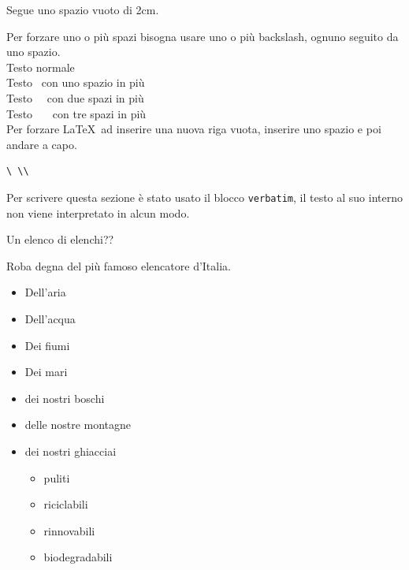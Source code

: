 \documentclass[envcountsame,envcountchap]{svmono}
\begin{document}
Segue uno spazio vuoto di 2cm.

\vspace*{2cm}

Per forzare uno o più spazi bisogna usare uno o più backslash, ognuno seguito da uno spazio.\\
Testo normale\\
Testo \ con uno spazio in più\\
Testo \ \ con due spazi in più\\
Testo \ \ \ con tre spazi in più\\

Per forzare \LaTeX\ ad inserire una nuova riga vuota, inserire uno spazio e poi andare a capo.\\
\begin{verbatim}
\ \\
\end{verbatim}
Per scrivere questa sezione è stato usato il blocco {\tt verbatim}, il testo al suo interno non viene
interpretato in alcun modo.



Un elenco di elenchi??

Roba degna del più famoso elencatore d'Italia. \citep{elencatoreSeriale}
\begin{itemize}
    \item Dell'aria
    \item Dell'acqua
    \item Dei fiumi
    \item Dei mari
    \item dei nostri boschi
    \item delle nostre montagne
    \item dei nostri ghiacciai
    \begin{itemize}
        \item puliti
        \item riciclabili
        \item rinnovabili
        \item biodegradabili
    \end{itemize} 
\end{itemize}
\end{document}
